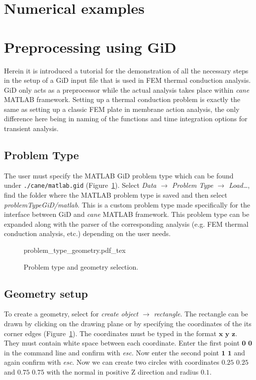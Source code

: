 \documentclass[10pt,a4paper]{article}
\begin{document}
\section{Numerical examples}\label{subsec:numerical_examples}



\section{Preprocessing using GiD}

Herein it is introduced a tutorial for the demonstration of all the necessary steps in the setup of a GiD input file that is used in FEM thermal conduction analysis. GiD only acts as a preprocessor while the actual analysis takes place within \textit{cane} MATLAB framework. Setting up a thermal conduction problem is exactly the same as setting up a classic FEM plate in membrane action analysis, the only difference here being in naming of the functions and time integration options for transient analysis.

\subsection{Problem Type}

The user must specify the MATLAB GiD problem type which can be found under \verb+./cane/matlab.gid+  (Figure~\ref{im:Problem_type_geometry}). Select \textit{Data $\rightarrow$ Problem Type $\rightarrow$ Load…}, find the folder where the MATLAB problem type is saved and then select \textit{problemTypeGiD/matlab}. This is a custom problem type made specifically for the interface between GiD and \textit{cane} MATLAB framework. This problem type can be expanded along with the parser of the corresponding analysis (e.g. FEM thermal conduction analysis, etc.) depending on the user needs.

\begin{figure}[ht]
	\centering
	\footnotesize
    \def\svgwidth{0.9\textwidth}{problem_type_geometry.pdf_tex}
	\caption{Problem type and geometry selection.}
	\label{im:Problem_type_geometry}
\end{figure}


\subsection{Geometry setup}

To create a geometry, select for \textit{create object $\rightarrow$ rectangle}. The rectangle can be drawn by clicking on the drawing plane or by specifying the coordinates of the its corner edges (Figure~\ref{im:Problem_type_geometry}). The coordinates must be typed in the format $\mathbf{x}$ $\mathbf{y}$ $\mathbf{z}$. They must contain white space between each coordinate. Enter the first point $\mathbf{0}$ $\mathbf{0}$ in the command line and confirm with \textit{esc}. Now enter the second point $\mathbf{1}$ $\mathbf{1}$ and again confirm with \textit{esc}. Now we can create two circles with coordinates $\mathbf{0.25}$ $\mathbf{0.25}$ and $\mathbf{0.75}$ $\mathbf{0.75}$ with the normal in positive Z direction and radius $\mathbf{0.1}$. \\
\end{document}
